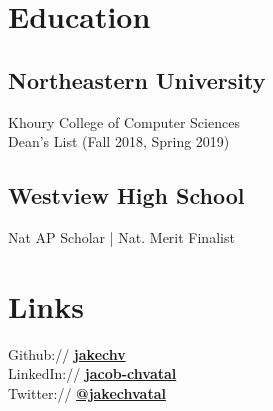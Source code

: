 \documentclass[letterpaper]{resume} %
\begin{document}
\lastupdated %


\begin{minipage}[t]{0.33\textwidth} %

\section{Education}
\subsection{Northeastern University}
Khoury College of Computer Sciences \\
Dean's List (Fall 2018, Spring 2019) \\
 \sectionspace %
\subsection{Westview High School}
Nat AP Scholar | Nat. Merit Finalist
\sectionspace %

\section{Links}
Github:// \href{https://github.com/jakechv}{\bf jakechv} \\
LinkedIn:// \href{https://www.linkedin.com/in/jacob-chvatal}{\bf jacob-chvatal} \\
Twitter:// \href{https://twitter.com/jakechvatal}{\bf @jakechvatal} \\
\sectionspace %


\end{minipage}
\end{document}
